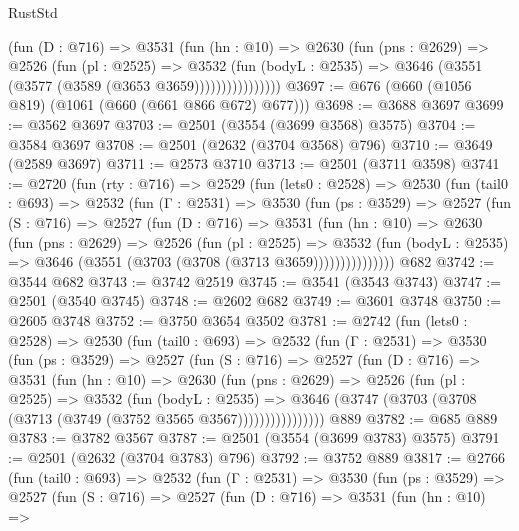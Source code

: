 \begin{lexlean}{RustStd}
\begin{coremodule}
                  (fun (D : @716) =>
                  @3531
                    (fun (hn : @10) =>
                    @2630
                      (fun (pns : @2629) =>
                      @2526
                        (fun (pl : @2525) =>
                        @3532
                          (fun (bodyL : @2535) =>
                          @3646 (@3551 (@3577 (@3589 (@3653 @3659))))))))))))))))
@3697 := @676 (@660 (@1056 @819) (@1061 (@660 (@661 @866 @672) @677)))
@3698 := @3688 @3697
@3699 := @3562 @3697
@3703 := @2501 (@3554 (@3699 @3568) @3575)
@3704 := @3584 @3697
@3708 := @2501 (@2632 (@3704 @3568) @796)
@3710 := @3649 (@2589 @3697)
@3711 := @2573 @3710
@3713 := @2501 (@3711 @3598)
@3741 := @2720
    (fun (rty : @716) =>
    @2529
      (fun (lets0 : @2528) =>
      @2530
        (fun (tail0 : @693) =>
        @2532
          (fun (Γ : @2531) =>
          @3530
            (fun (ps : @3529) =>
            @2527
              (fun (S : @716) =>
              @2527
                (fun (D : @716) =>
                @3531
                  (fun (hn : @10) =>
                  @2630
                    (fun (pns : @2629) =>
                    @2526
                      (fun (pl : @2525) =>
                      @3532
                        (fun (bodyL : @2535) =>
                        @3646 (@3551 (@3703 (@3708 (@3713 @3659)))))))))))))))
    @682
@3742 := @3544 @682
@3743 := @3742 @2519
@3745 := @3541 (@3543 @3743)
@3747 := @2501 (@3540 @3745)
@3748 := @2602 @682
@3749 := @3601 @3748
@3750 := @2605 @3748
@3752 := @3750 @3654 @3502
@3781 := @2742
    (fun (lets0 : @2528) =>
    @2530
      (fun (tail0 : @693) =>
      @2532
        (fun (Γ : @2531) =>
        @3530
          (fun (ps : @3529) =>
          @2527
            (fun (S : @716) =>
            @2527
              (fun (D : @716) =>
              @3531
                (fun (hn : @10) =>
                @2630
                  (fun (pns : @2629) =>
                  @2526
                    (fun (pl : @2525) =>
                    @3532
                      (fun (bodyL : @2535) =>
                      @3646 (@3747 (@3703 (@3708 (@3713 (@3749 (@3752 @3565 @3567))))))))))))))))
    @889
@3782 := @685 @889
@3783 := @3782 @3567
@3787 := @2501 (@3554 (@3699 @3783) @3575)
@3791 := @2501 (@2632 (@3704 @3783) @796)
@3792 := @3752 @889
@3817 := @2766
    (fun (tail0 : @693) =>
    @2532
      (fun (Γ : @2531) =>
      @3530
        (fun (ps : @3529) =>
        @2527
          (fun (S : @716) =>
          @2527
            (fun (D : @716) =>
            @3531
              (fun (hn : @10) =>

\end{coremodule}
\end{lexlean}
